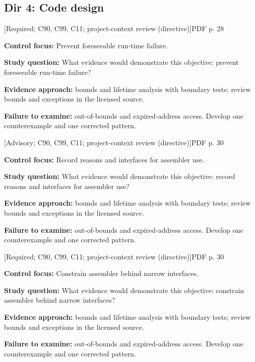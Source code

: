 \documentclass[10pt,letterpaper]{article}
\begin{document}
\subsection{Dir 4: Code design}
 \textsf{\footnotesize [Required; C90, C99, C11; project-context review (directive)]}\hfill{\footnotesize PDF p. 28}\par
\textbf{Control focus:} Prevent foreseeable run-time failure.\par
\textbf{Study question:} What evidence would demonstrate this objective: prevent foreseeable run-time failure?\par
\textbf{Evidence approach:} bounds and lifetime analysis with boundary tests; review bounds and exceptions in the licensed source.\par
\textbf{Failure to examine:} out-of-bounds and expired-address access. Develop one counterexample and one corrected pattern.\par
\smallskip
{}
 \textsf{\footnotesize [Advisory; C90, C99, C11; project-context review (directive)]}\hfill{\footnotesize PDF p. 30}\par
\textbf{Control focus:} Record reasons and interfaces for assembler use.\par
\textbf{Study question:} What evidence would demonstrate this objective: record reasons and interfaces for assembler use?\par
\textbf{Evidence approach:} bounds and lifetime analysis with boundary tests; review bounds and exceptions in the licensed source.\par
\textbf{Failure to examine:} out-of-bounds and expired-address access. Develop one counterexample and one corrected pattern.\par
\smallskip
{}
 \textsf{\footnotesize [Required; C90, C99, C11; project-context review (directive)]}\hfill{\footnotesize PDF p. 30}\par
\textbf{Control focus:} Constrain assembler behind narrow interfaces.\par
\textbf{Study question:} What evidence would demonstrate this objective: constrain assembler behind narrow interfaces?\par
\textbf{Evidence approach:} bounds and lifetime analysis with boundary tests; review bounds and exceptions in the licensed source.\par
\textbf{Failure to examine:} out-of-bounds and expired-address access. Develop one counterexample and one corrected pattern.\par
\end{document}
